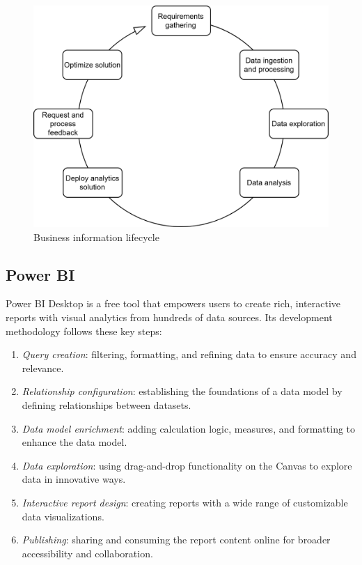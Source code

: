 \begin{figure}[H]
    \centering
    \includegraphics[width=0.5\linewidth]{images/bis7.png}
    \caption{Business information lifecycle}
\end{figure}

\subsection{Power BI}
Power BI Desktop is a free tool that empowers users to create rich, interactive reports with visual analytics from hundreds of data sources. 
Its development methodology follows these key steps:
\begin{enumerate}
    \item \textit{Query creation}: filtering, formatting, and refining data to ensure accuracy and relevance.
    \item \textit{Relationship configuration}: establishing the foundations of a data model by defining relationships between datasets.
    \item \textit{Data model enrichment}: adding calculation logic, measures, and formatting to enhance the data model.
    \item \textit{Data exploration}: using drag-and-drop functionality on the Canvas to explore data in innovative ways.
    \item \textit{Interactive report design}: creating reports with a wide range of customizable data visualizations.
    \item \textit{Publishing}: sharing and consuming the report content online for broader accessibility and collaboration.
\end{enumerate}
